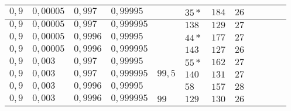 \begin{table}[h]
\begin{tabular}{|l|l|l|l||l||l|l|l|l|l|l|l|}
$ 0,9  $ & $0,00005$ & $0,997$  & $0,99995$  &&  $35* $ & $184 $   & $26 $  \\ \hline
$ 0,9  $ & $0,00005$ & $0,997$  & $0,999995$ &&  $138   $ & $129 $   & $27 $  \\ \hline
$ 0,9  $ & $0,00005$ & $0,9996$ & $0,99995$  &&  $44* $ & $177 $   & $27 $  \\ \hline
$ 0,9  $ & $0,00005$ & $0,9996$ & $0,999995$ &&  $143   $ & $127 $  & $26 $  \\ \hline
$ 0,9  $ & $0,003 $  & $0,997$  & $0,99995$  &&  $55* $ & $162 $   & $ 27$  \\ \hline
\cellcolor{gray!40}$ 0,9  $ & \cellcolor{gray!40}$0,003 $  & \cellcolor{gray!40}$0,997$  & \cellcolor{gray!40}$0,999995$ &$99,5$&$140  $ & $131   $ & $27 $  \\ \hline
$ 0,9  $ & $0,003 $  & $0,9996$ & $0,99995$  &&  $58   $ & $157 $   & $28 $  \\ \hline
\cellcolor{gray!40}$ 0,9  $ &\cellcolor{gray!40}$0,003 $  & \cellcolor{gray!40}$0,9996$ & \cellcolor{gray!40}$0,999995$ &$99$& $129 $ & $130 $ & $26 $  \\ \hline
\end{tabular}
\end{table}


